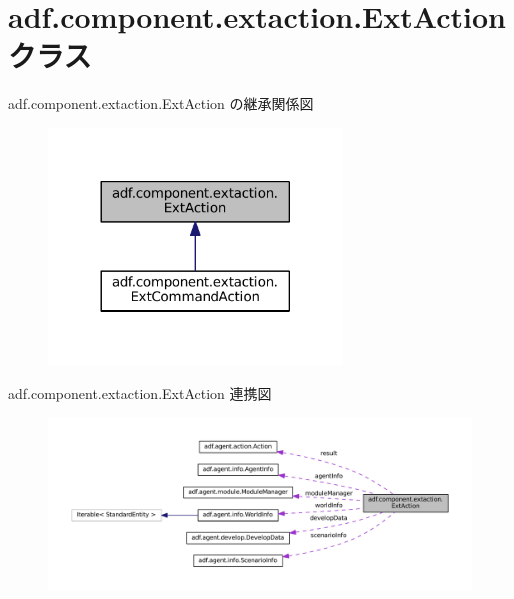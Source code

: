 \hypertarget{classadf_1_1component_1_1extaction_1_1ExtAction}{}\section{adf.\+component.\+extaction.\+Ext\+Action クラス}
\label{classadf_1_1component_1_1extaction_1_1ExtAction}


adf.\+component.\+extaction.\+Ext\+Action の継承関係図
\nopagebreak
\begin{figure}[H]
\begin{center}
\leavevmode
\includegraphics[width=221pt]{classadf_1_1component_1_1extaction_1_1ExtAction__inherit__graph}
\end{center}
\end{figure}


adf.\+component.\+extaction.\+Ext\+Action 連携図
\nopagebreak
\begin{figure}[H]
\begin{center}
\leavevmode
\includegraphics[width=350pt]{classadf_1_1component_1_1extaction_1_1ExtAction__coll__graph}
\end{center}
\end{figure}
